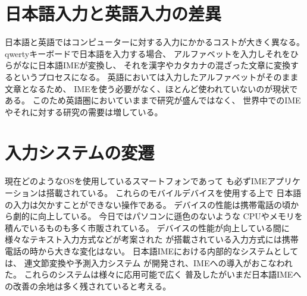 \section{日本語入力と英語入力の差異}
日本語と英語ではコンピューターに対する入力にかかるコストが大きく異なる。
qwertyキーボードで日本語を入力する場合、
アルファベットを入力しそれをひらがなに日本語IMEが変換し、
それを漢字やカタカナの混ざった文章に変換するというプロセスになる。
英語においては入力したアルファベットがそのまま文章となるため、
IMEを使う必要がなく、ほとんど使われていないのが現状である。
このため英語圏においていままで研究が盛んではなく、
世界中でのIMEやそれに対する研究の需要は増している。

\section{入力システムの変遷}
現在どのようなOSを使用しているスマートフォンであって
も必ずIMEアプリケーションは搭載されている。
これらのモバイルデバイスを使用する上で
日本語の入力は欠かすことができない操作である。
デバイスの性能は携帯電話の頃から劇的に向上している。
今日ではパソコンに遜色のないような
CPUやメモリを積んでいるものも多く市販されている。
デバイスの性能が向上している間に
様々なテキスト入力方式などが考案された\cite{増井俊之:2002-08-01}
が搭載されている入力方式には携帯電話の時から大きな変化はない。
日本語IMEにおける内部的なシステムとしては、
連文節変換や予測入力システム\cite{pobox}
が開発され、IMEへの導入がおこなわれた。
これらのシステムは様々に応用可能で広く
普及したがいまだ日本語IMEへの改善の余地は多く残されていると考える。

